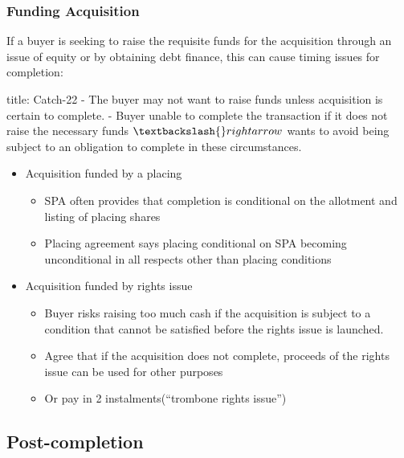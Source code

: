 \documentclass[
]{article}
\newenvironment{Shaded}{}{}
\newcommand{\NormalTok}[1]{#1}
\providecommand{\tightlist}{%
  \setlength{\itemsep}{0pt}\setlength{\parskip}{0pt}}
\begin{document}
\hypertarget{funding-acquisition}{%
\subsubsection{Funding Acquisition}\label{funding-acquisition}}

If a buyer is seeking to raise the requisite funds for the acquisition
through an issue of equity or by obtaining debt finance, this can cause
timing issues for completion:

\begin{Shaded}
\begin{Highlighting}[]
\NormalTok{title: Catch{-}22}
\NormalTok{{-} The buyer may not want to raise funds unless acquisition is certain to complete. }
\NormalTok{{-} Buyer unable to complete the transaction if it does not raise the necessary funds $\textbackslash{}rightarrow$ wants to avoid being subject to an obligation to complete in these circumstances. }
\end{Highlighting}
\end{Shaded}

\begin{itemize}
\tightlist
\item
  Acquisition funded by a placing

  \begin{itemize}
  \tightlist
  \item
    SPA often provides that completion is conditional on the allotment
    and listing of placing shares
  \item
    Placing agreement says placing conditional on SPA becoming
    unconditional in all respects other than placing conditions
  \end{itemize}
\item
  Acquisition funded by rights issue

  \begin{itemize}
  \tightlist
  \item
    Buyer risks raising too much cash if the acquisition is subject to a
    condition that cannot be satisfied before the rights issue is
    launched.
  \item
    Agree that if the acquisition does not complete, proceeds of the
    rights issue can be used for other purposes
  \item
    Or pay in 2 instalments(``trombone rights issue'')
  \end{itemize}
\end{itemize}

\hypertarget{post-completion}{%
\subsection{Post-completion}\label{post-completion}}
\end{document}
